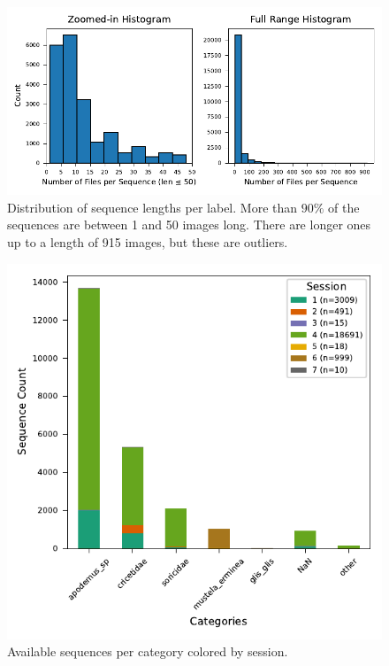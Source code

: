     

    

    \begin{figure}[ht]
    \centering
    \includegraphics{figures/seq_len_histograms.pdf}
    \caption{Distribution of sequence lengths per label. More than \(90\%\) of the sequences are between 1 and 50 images long. There are longer ones up to a length of 915 images, but these are outliers.}
    \label{fig:seq_len_histograms}
    \end{figure}

    \begin{figure}[ht]
    \centering
    \includegraphics{figures/label2_session.pdf}
    \caption{Available sequences per category colored by session.}
    \label{fig:sequenceperlabel}
    \end{figure}

